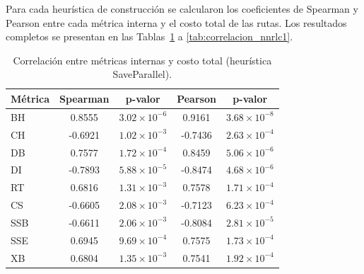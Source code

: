 Para cada heur\'istica de construcci\'on se calcularon los coeficientes de Spearman y Pearson entre cada m\'etrica interna y el costo total de las rutas. Los resultados completos se presentan en las Tablas~\ref{tab:correlacion_saveparallel} a \ref{tab:correlacion_nnrlc1}.

\begin{table}[H]
\centering
\caption{Correlaci\'on entre m\'etricas internas y costo total (heur\'istica SaveParallel).}
\label{tab:correlacion_saveparallel}
\small
\begin{tabular}{@{}lcccc@{}}
\toprule
\textbf{M\'etrica} & \textbf{Spearman} & \textbf{p-valor} & \textbf{Pearson} & \textbf{p-valor} \\
\midrule
BH & 0.8555 & $3.02\times10^{-6}$ & 0.9161 & $3.68\times10^{-8}$ \\
CH & -0.6921 & $1.02\times10^{-3}$ & -0.7436 & $2.63\times10^{-4}$ \\
DB & 0.7577 & $1.72\times10^{-4}$ & 0.8459 & $5.06\times10^{-6}$ \\
DI & -0.7893 & $5.88\times10^{-5}$ & -0.8474 & $4.68\times10^{-6}$ \\
RT & 0.6816 & $1.31\times10^{-3}$ & 0.7578 & $1.71\times10^{-4}$ \\
CS & -0.6605 & $2.08\times10^{-3}$ & -0.7123 & $6.23\times10^{-4}$ \\
SSB & -0.6611 & $2.06\times10^{-3}$ & -0.8084 & $2.81\times10^{-5}$ \\
SSE & 0.6945 & $9.69\times10^{-4}$ & 0.7575 & $1.73\times10^{-4}$ \\
XB & 0.6804 & $1.35\times10^{-3}$ & 0.7541 & $1.92\times10^{-4}$ \\
\bottomrule
\end{tabular}
\end{table}

